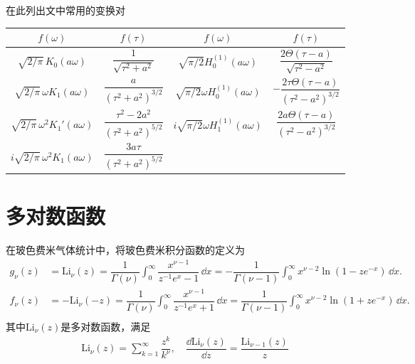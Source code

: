 在此列出文中常用的变换对
\begin{table}[htbp]
	\centering
	\begin{tabular}{|c|c|c|c|}
		\toprule
		\(f(\omega)\)                                    & \(f(\tau)\)                                             & \(f(\omega)\)                                  & \(f(\tau)\)                                                    \\
		\midrule
		\(\sqrt{2/\pi} \, K_{0}(a \omega)\)              & \(\dfrac{1}{\sqrt{\tau^{2} + a^{2}}}\)                  & \(\sqrt{\pi/2}H_{0}^{(1)}(a \omega)\)          & \(\dfrac{2 \Theta(\tau - a)}{\sqrt{\tau^{2} - a^{2}}}\)        \\[8pt]
		\(\sqrt{2/\pi} \, \omega K_{1}(a \omega)\)       & \(\dfrac{a}{(\tau^{2} + a^{2})^{3/2}}\)                 & \(\sqrt{\pi/2}\omega H_{0}^{(1)}(a \omega)\)   & \(-\dfrac{2 \tau \Theta(\tau - a)}{(\tau^{2} - a^{2})^{3/2}}\) \\[8pt]
		\(\sqrt{2/\pi} \, \omega^{2} K_{1}'(a \omega)\)  & \(\dfrac{\tau^{2} - 2a^{2}}{(\tau^{2} + a^{2})^{5/2}}\) & \(i \sqrt{\pi/2}\omega H_{1}^{(1)}(a \omega)\) & \(\dfrac{2 a \Theta(\tau - a)}{(\tau^{2} - a^{2})^{3/2}}\)     \\[8pt]
		\(i \sqrt{2/\pi} \, \omega^{2} K_{1}(a \omega)\) & \(\dfrac{3 a \tau}{(\tau^{2} + a^{2})^{5/2}}\)          &                                                &                                                                \\
		\bottomrule
	\end{tabular}
\end{table}

\section{多对数函数}

在玻色费米气体统计中，将玻色费米积分函数的定义为
\begin{align*}
	g_{\nu}(z) &= \mathrm{Li}_{\nu}(z) = \dfrac{1}{\Gamma(\nu)} \int_{0}^{\infty} \dfrac{x^{\nu-1}}{z^{-1} e^{x} - 1} \, \dd x = -\dfrac{1}{\Gamma(\nu-1)} \int_{0}^{\infty} x^{\nu-2} \ln(1 - z e^{-x}) \, \dd x. \\
	f_{\nu}(z) &= -\mathrm{Li}_{\nu}(-z) = \dfrac{1}{\Gamma(\nu)} \int_{0}^{\infty} \dfrac{x^{\nu-1}}{z^{-1} e^{x} + 1} \, \dd x = \dfrac{1}{\Gamma(\nu-1)} \int_{0}^{\infty} x^{\nu-2} \ln(1 + z e^{-x}) \, \dd x. \\
\end{align*}
其中\(\mathrm{Li}_{\nu}(z) \)是多对数函数，满足
\begin{align*}
	\mathrm{Li}_{\nu}(z) = \sum_{k=1}^{\infty} \dfrac{z^{k}}{k^{\nu}},\quad \dfrac{\dd  \mathrm{Li}_{\nu}(z)}{\dd  z} = \dfrac{\mathrm{Li}_{\nu-1}(z)}{z}
\end{align*}

